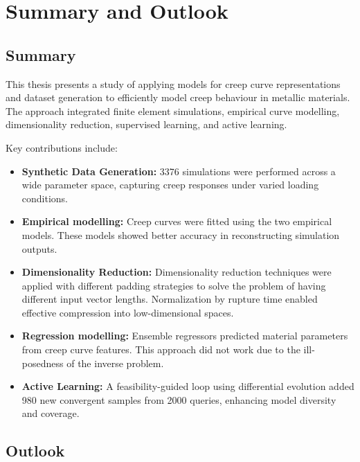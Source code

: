 \documentclass[class=scrbook, crop=false]{standalone}
\begin{document}
\chapter{Summary and Outlook}
\label{Chapter::Summary_Outlook}

\section{Summary}

This thesis presents a study of applying models for creep curve representations and dataset generation to efficiently model creep behaviour in metallic materials. The approach integrated finite element simulations, empirical curve modelling, dimensionality reduction, supervised learning, and active learning.

Key contributions include:

\begin{itemize}
	\item \textbf{Synthetic Data Generation:} 3376 simulations were performed across a wide parameter space, capturing creep responses under varied loading conditions.
	
	\item \textbf{Empirical modelling:} Creep curves were fitted using the two empirical models. These models showed better accuracy in reconstructing simulation outputs.
	
	\item \textbf{Dimensionality Reduction:} Dimensionality reduction techniques were applied with different padding strategies to solve the problem of having different input vector lengths. Normalization by rupture time enabled effective compression into low-dimensional spaces.
	
	\item \textbf{Regression modelling:} Ensemble regressors predicted material parameters from creep curve features.  This approach did not work due to the ill-posedness of the inverse problem.
	
	\item \textbf{Active Learning:} A feasibility-guided loop using differential evolution added 980 new convergent samples from 2000 queries, enhancing model diversity and coverage.
\end{itemize}

\section{Outlook}
\end{document}
